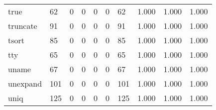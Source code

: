 \begin{longtable}{lp{1.3cm}p{1.3cm}p{1.3cm}p{1.3cm}p{1.3cm}p{1.3cm}p{1.3cm}p{1.3cm}p{1.3cm}}
true      &                     62 &                                             0 &                                            0 &                                           0 &                                            0 &                                         62 &                                1.000 &                                  1.000 &                                1.000 \\
truncate  &                     91 &                                             0 &                                            0 &                                           0 &                                            0 &                                         91 &                                1.000 &                                  1.000 &                                1.000 \\
tsort     &                     85 &                                             0 &                                            0 &                                           0 &                                            0 &                                         85 &                                1.000 &                                  1.000 &                                1.000 \\
tty       &                     65 &                                             0 &                                            0 &                                           0 &                                            0 &                                         65 &                                1.000 &                                  1.000 &                                1.000 \\
uname     &                     67 &                                             0 &                                            0 &                                           0 &                                            0 &                                         67 &                                1.000 &                                  1.000 &                                1.000 \\
unexpand  &                    101 &                                             0 &                                            0 &                                           0 &                                            0 &                                        101 &                                1.000 &                                  1.000 &                                1.000 \\
uniq      &                    125 &                                             0 &                                            0 &                                           0 &                                            0 &                                        125 &                                1.000 &                                  1.000 &                                1.000 \\

\end{longtable}
